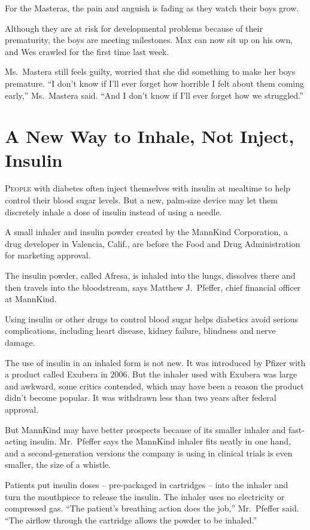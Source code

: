 ﻿\documentclass[12pt]{article}
\begin{document}
For the Masteras, the pain and anguish is fading as they watch their boys grow.

Although they are at risk for developmental problems because of their prematurity, the boys are
meeting milestones. Max can now sit up on his own, and Wes crawled for the first time last week.

Ms.~Mastera still feels guilty, worried that she did something to make her boys premature. ``I don't
know if I'll ever forget how horrible I felt about them coming early,'' Ms.~Mastera said. ``And I
don't know if I'll ever forget how we struggled.''

\section{A New Way to Inhale, Not Inject, Insulin}

\lettrine{P}{eople} with diabetes often inject themselves with insulin at
mealtime to help control their blood sugar levels. But a new, palm-size device may let them
discretely inhale a dose of insulin instead of using a needle.

A small inhaler and insulin powder created by the MannKind Corporation, a drug developer in
Valencia, Calif., are before the Food and Drug Administration for marketing approval.

The insulin powder, called Afresa, is inhaled into the lungs, dissolves there and then travels into
the bloodstream, says Matthew J.~Pfeffer, chief financial officer at MannKind.

Using insulin or other drugs to control blood sugar helps diabetics avoid serious complications,
including heart disease, kidney failure, blindness and nerve damage.

The use of insulin in an inhaled form is not new. It was introduced by Pfizer with a product called
Exubera in 2006. But the inhaler used with Exubera was large and awkward, some critics contended,
which may have been a reason the product didn't become popular. It was withdrawn less than two years
after federal approval.

But MannKind may have better prospects because of its smaller inhaler and fast-acting insulin.
Mr.~Pfeffer says the MannKind inhaler fits neatly in one hand, and a second-generation versions the
company is using in clinical trials is even smaller, the size of a whistle.

Patients put insulin doses -- pre-packaged in cartridges -- into the inhaler and turn the mouthpiece
to release the insulin. The inhaler uses no electricity or compressed gas. ``The patient's breathing
action does the job,'' Mr.~Pfeffer said. ``The airflow through the cartridge allows the powder to be
inhaled.''
\end{document}
